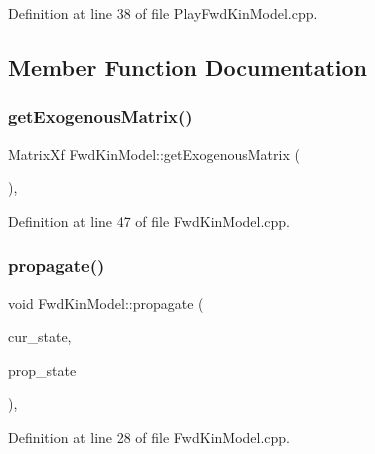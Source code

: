 Definition at line 38 of file Play\+Fwd\+Kin\+Model.\+cpp.



\subsection{Member Function Documentation}
\mbox{\label{classFwdKinModel_ac8ed4e8a52f5ff33cc158c80c6cf083e}} 
\subsubsection{\texorpdfstring{get\+Exogenous\+Matrix()}{getExogenousMatrix()}}
{\footnotesize\ttfamily Matrix\+Xf Fwd\+Kin\+Model\+::get\+Exogenous\+Matrix (\begin{DoxyParamCaption}{ }\end{DoxyParamCaption})\hspace{0.3cm}{\ttfamily [override]}, {\ttfamily [inherited]}}



Definition at line 47 of file Fwd\+Kin\+Model.\+cpp.

\mbox{\label{classFwdKinModel_a9461ff14a1ae8d05169e8f1c7a6237c7}} 
\subsubsection{\texorpdfstring{propagate()}{propagate()}}
{\footnotesize\ttfamily void Fwd\+Kin\+Model\+::propagate (\begin{DoxyParamCaption}\item[{const Eigen\+::\+Ref$<$ const Eigen\+::\+Matrix\+Xf $>$ \&}]{cur\+\_\+state,  }\item[{Eigen\+::\+Ref$<$ Eigen\+::\+Matrix\+Xf $>$}]{prop\+\_\+state }\end{DoxyParamCaption})\hspace{0.3cm}{\ttfamily [override]}, {\ttfamily [inherited]}}



Definition at line 28 of file Fwd\+Kin\+Model.\+cpp.

